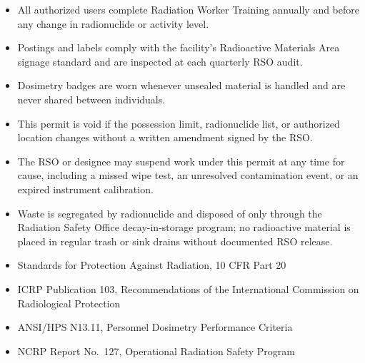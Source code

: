 

\begin{itemize}[label=\OpenBox]
\item All authorized users complete Radiation Worker Training annually and before any change
in radionuclide or activity level.
\item Postings and labels comply with the facility's Radioactive Materials Area signage
standard and are inspected at each quarterly RSO audit.
\item Dosimetry badges are worn whenever unsealed material is handled and are never shared
between individuals.
\item This permit is void if the possession limit, radionuclide list, or authorized location
changes without a written amendment signed by the RSO.
\item The RSO or designee may suspend work under this permit at any time for cause, including a
missed wipe test, an unresolved contamination event, or an expired instrument calibration.
\item Waste is segregated by radionuclide and disposed of only through the Radiation Safety
Office decay-in-storage program; no radioactive material is placed in regular trash or sink
drains without documented RSO release.
\end{itemize}


\begin{itemize}
\item Standards for Protection Against Radiation, 10 CFR Part 20~\cite{nrc10cfr20}
\item ICRP Publication 103, Recommendations of the International Commission on Radiological
Protection~\cite{icrp103}
\item ANSI/HPS N13.11, Personnel Dosimetry Performance Criteria~\cite{ansi_n13_11}
\item NCRP Report No.\ 127, Operational Radiation Safety Program~\cite{ncrp127}
\end{itemize}


